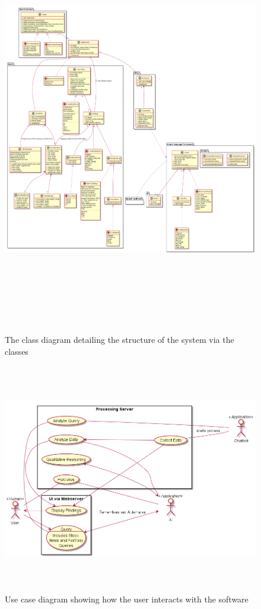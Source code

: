 \documentclass[]{IEEEtran}
\begin{document}
	\begin{figure}[h]
		\includegraphics[width=\textwidth, height = 18cm]{classdiagram}
		\caption{The class diagram detailing the structure of the system via the classes}
	\end{figure}
	
	\begin{figure}[h]
		\includegraphics[width=\textwidth, height=10cm]{usecase}
		\caption{Use case diagram showing how the user interacts with the software}
	\end{figure}
	
\end{document}
